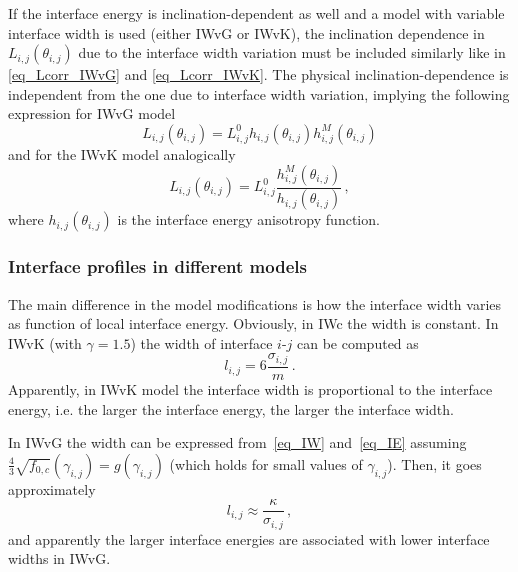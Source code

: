 		If the interface energy is inclination-dependent as well and a model with variable interface width is used (either IWvG or IWvK), the inclination dependence in $L_{i,j}(\theta_{i,j})$ due to the interface width variation must be included similarly like in \eqref{eq_Lcorr_IWvG} and \eqref{eq_Lcorr_IWvK}. The physical inclination-dependence is independent from the one due to interface width variation, implying the following expression for IWvG model
		\begin{equation}     
			L_{i,j}(\theta_{i,j}) = L_{i,j}^0h_{i,j}(\theta_{i,j})h_{i,j}^M(\theta_{i,j})
		\end{equation}
		and for the IWvK model analogically
		\begin{equation}
			L_{i,j}(\theta_{i,j}) = L_{i,j}^0\frac{h_{i,j}^M(\theta_{i,j})}{h_{i,j}(\theta_{i,j})} \,,
		\end{equation}
		where $h_{i,j}(\theta_{i,j})$ is the interface energy anisotropy function.

		\subsubsection{Interface profiles in different models} \label{sec_difference_in_profiles}
		The main difference in the model modifications is how the interface width varies as function of local interface energy. Obviously, in IWc the width is constant. In IWvK (with $\gamma=1.5$) the width of interface $i$-$j$ can be computed as
		\begin{equation}
			l_{i,j} = 6\frac{\sigma_{i,j}}{m} \,.
		\end{equation}
		Apparently, in IWvK model the interface width is proportional to the interface energy, i.e. the larger the interface energy, the larger the interface width.
		
		In IWvG the width can be expressed from~\eqref{eq_IW} and~\eqref{eq_IE} assuming $\frac{4}{3}\sqrt{f_{0,c}}(\gamma_{i,j})=g(\gamma_{i,j})$ (which holds for small values of $\gamma_{i,j}$). Then, it goes approximately
		\begin{equation}
			l_{i,j} \approx \frac{\kappa}{\sigma_{i,j}} \,,
		\end{equation}
		and apparently the larger interface energies are associated with lower interface widths in IWvG. 

